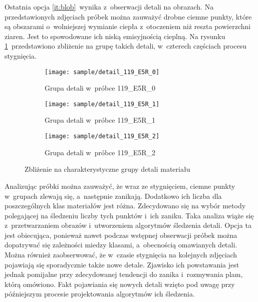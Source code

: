 Ostatnia opcja \ref{it:blob}~wynika z~obserwacji detali na obrazach.
Na przedstawionych zdjęciach próbek można zauważyć drobne ciemne punkty, które
są obszarami o~wolniejszej wymianie ciepła z~otoczeniem niż reszta powierzchni
ziaren.
Jest to spowodowane ich niską emisyjnością cieplną.
Na rysunku \ref{fig:blob_detail}~przedstawiono zbliżenie na grupę takich detali,
w~czterech częściach procesu stygnięcia.
\begin{figure}[h]
    \hspace*{\fill}
    \begin{subfigure}{0.3\textwidth}
        \centering
        \texttt{[image: sample/detail\_119\_E5R\_0]}
        \caption{Grupa detali w~próbce 119\_E5R\_0}
    \end{subfigure}
    \hfill
    \centering
    \begin{subfigure}{0.3\textwidth}
        \centering
        \texttt{[image: sample/detail\_119\_E5R\_1]}
        \caption{Grupa detali w~próbce 119\_E5R\_1}
    \end{subfigure}
    \hfill
    \begin{subfigure}{0.3\textwidth}
        \centering
        \texttt{[image: sample/detail\_119\_E5R\_2]}
        \caption{Grupa detali w~próbce 119\_E5R\_2}
    \end{subfigure}
    \hspace*{\fill}
    \caption{Zbliżenie na charakterystyczne grupy detali materiału}
    \label{fig:blob_detail}
\end{figure}

Analizując próbki można zauważyć, że wraz ze stygnięciem, ciemne punkty
w~grupach zlewają się, a~następnie zanikają.
Dodatkowo ich liczba dla poszczególnych klas materiałów jest różna.
Zdecydowano się na wybór metody polegającej na śledzeniu liczby tych punktów
i~ich zaniku.
Taka analiza wiąże się z~przetwarzaniem obrazów i~utworzeniem algorytmów
śledzenia detali.
Opcja ta jest obiecująca, ponieważ nawet podczas wstępnej obserwacji próbek
można dopatrywać się zależności miedzy klasami, a~obecnością omawianych detali.
Można również zaobserwować, że w~czasie stygnięcia na kolejnych zdjęciach
pojawiają się sporadycznie także nowe detale.
Zjawisko ich powstawania jest jednak pomijalne przy zdecydowanej tendencji do
zanika i~rozmywania plam, którą omówiono.
Fakt pojawiania się nowych detali wzięto pod uwagę przy późniejszym procesie
projektowania algorytmów ich śledzenia.

